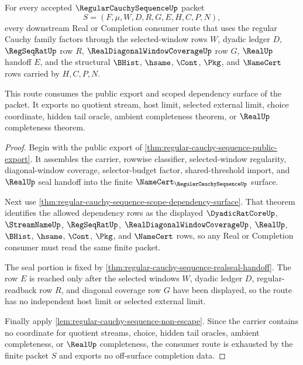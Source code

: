\begin{theorem}
\label{thm:regular-cauchy-sequence-mature-consumer-route}
For every accepted $\RegularCauchySequenceUp$ packet
$$
S=(F,\mu,W,D,R,G,E,H,C,P,N),
$$
every downstream Real or Completion consumer route that uses the regular Cauchy family factors through the selected-window rows $W$, dyadic ledger $D$, $\RegSeqRatUp$ row $R$, $\RealDiagonalWindowCoverageUp$ row $G$, $\RealUp$ handoff $E$, and the structural $\BHist$, $\hsame$, $\Cont$, $\Pkg$, and $\NameCert$ rows carried by $H,C,P,N$.

This route consumes the public export and scoped dependency surface of the packet. It exports no quotient stream, host limit, selected external limit, choice coordinate, hidden tail oracle, ambient completeness theorem, or $\RealUp$ completeness theorem.
\end{theorem}
\begin{proof}
Begin with the public export of \autoref{thm:regular-cauchy-sequence-public-export}. It assembles the carrier, rowwise classifier, selected-window regularity, diagonal-window coverage, selector-budget factor, shared-threshold import, and $\RealUp$ seal handoff into the finite $\NameCert_{\RegularCauchySequenceUp}$ surface.

Next use \autoref{thm:regular-cauchy-sequence-scope-dependency-surface}. That theorem identifies the allowed dependency rows as the displayed $\DyadicRatCoreUp$, $\StreamNameUp$, $\RegSeqRatUp$, $\RealDiagonalWindowCoverageUp$, $\RealUp$, $\BHist$, $\hsame$, $\Cont$, $\Pkg$, and $\NameCert$ rows, so any Real or Completion consumer must read the same finite packet.

The seal portion is fixed by \autoref{thm:regular-cauchy-sequence-realseal-handoff}. The row $E$ is reached only after the selected windows $W$, dyadic ledger $D$, regular-readback row $R$, and diagonal coverage row $G$ have been displayed, so the route has no independent host limit or selected external limit.

Finally apply \autoref{lem:regular-cauchy-sequence-non-escape}. Since the carrier contains no coordinate for quotient streams, choice, hidden tail oracles, ambient completeness, or $\RealUp$ completeness, the consumer route is exhausted by the finite packet $S$ and exports no off-surface completion data.
\end{proof}

